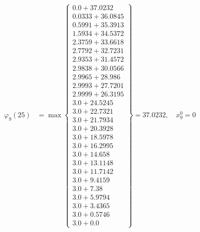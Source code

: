 \documentclass{article}
\begin{document}
\begin{align*}
  
\varphi_{9}(25) &= \max \left\{ \begin{array}{c}
0.0 + 37.0232 \\
 0.0333 + 36.0845 \\
 0.5991 + 35.3913 \\
 1.5934 + 34.5372 \\
 2.3759 + 33.6618 \\
 2.7792 + 32.7231 \\
 2.9353 + 31.4572 \\
 2.9838 + 30.0566 \\
 2.9965 + 28.986 \\
 2.9993 + 27.7201 \\
 2.9999 + 26.3195 \\
 3.0 + 24.5245 \\
 3.0 + 22.7321 \\
 3.0 + 21.7934 \\
 3.0 + 20.3928 \\
 3.0 + 18.5978 \\
 3.0 + 16.2995 \\
 3.0 + 14.658 \\
 3.0 + 13.1148 \\
 3.0 + 11.7142 \\
 3.0 + 9.4159 \\
 3.0 + 7.38 \\
 3.0 + 5.9794 \\
 3.0 + 3.4365 \\
 3.0 + 0.5746 \\
 3.0 + 0.0
\end{array} \right\}=37.0232,\quad x_{9}^0=0\\
  
  
  

\end{align*}
\end{document}
